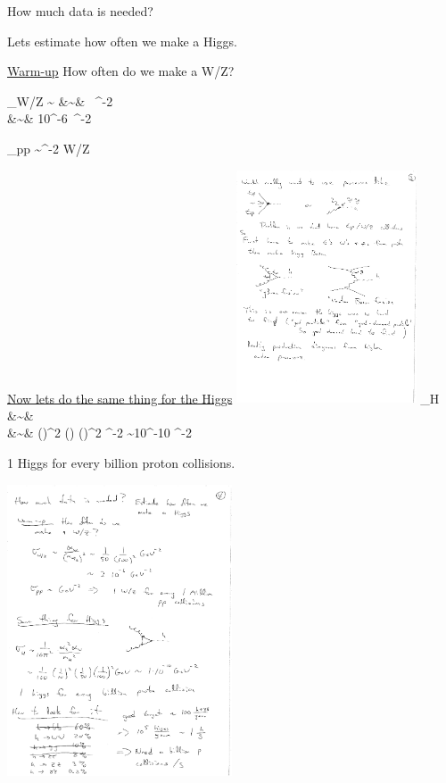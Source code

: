 {\lineacross 

How much data is needed?

Lets estimate how often we make a Higgs.

\underline{Warm-up} How often do we make a W/Z? 

\bea
\sigma_{W/Z} \sim {} &\sim& \ \GeV^{-2}\\
&\sim& 10^{-6}\ \GeV^{-2}
\eea

\be
\sigma_{pp} \sim \GeV^{-2}  W/Z\  
\ee

\clearpage

\underline{Now lets do the same thing for the Higgs}
\bc
\includegraphics[width=0.4\textwidth]{./ggF.pdf}
\ec
\bea
\sigma_H &\sim&  \\
&\sim&  \left(\right)^2 \left(\right) \left(\right)^2 \GeV^{-2} \sim 10^{-10} \GeV^{-2}
\eea

1 Higgs for every billion proton collisions.

\lineacross
\bc
\includegraphics[width=0.5\textwidth]{./HiggsTable.pdf}
\ec

}
